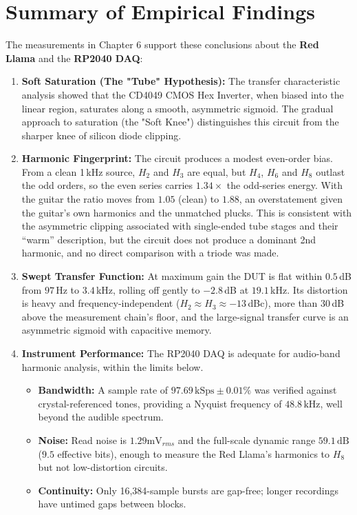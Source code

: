 \documentclass[11pt, a4paper]{report}
\begin{document}
\section{Summary of Empirical Findings}
The measurements in Chapter 6 support these conclusions about the \textbf{Red Llama} and the \textbf{RP2040 DAQ}:

\begin{enumerate}
  \item \textbf{Soft Saturation (The "Tube" Hypothesis):}
    The transfer characteristic analysis showed that the CD4049 CMOS Hex Inverter, when biased into the linear region, saturates along a smooth, asymmetric sigmoid.\cite{ti_cd4049ub_datasheet} The gradual approach to saturation (the "Soft Knee") distinguishes this circuit from the sharper knee of silicon diode clipping.

  \item \textbf{Harmonic Fingerprint:}
    The circuit produces a modest even-order bias. From a clean 1\,kHz source, $H_2$ and $H_3$ are equal, but $H_4$, $H_6$ and $H_8$ outlast the odd orders, so the even series carries $1.34\times$ the odd-series energy. With the guitar the ratio moves from $1.05$ (clean) to $1.88$, an overstatement given the guitar's own harmonics and the unmatched plucks. This is consistent with the asymmetric clipping associated with single-ended tube stages and their ``warm'' description,\cite{sonarworks_distortion_even_odd} but the circuit does not produce a dominant 2nd harmonic, and no direct comparison with a triode was made.

  \item \textbf{Swept Transfer Function:}
    At maximum gain the DUT is flat within $0.5$\,dB from $97$\,Hz to $3.4$\,kHz, rolling off gently to $-2.8$\,dB at $19.1$\,kHz. Its distortion is heavy and frequency-independent ($H_2 \approx H_3 \approx -13$\,dBc), more than $30$\,dB above the measurement chain's floor, and the large-signal transfer curve is an asymmetric sigmoid with capacitive memory.

  \item \textbf{Instrument Performance:}
    The RP2040 DAQ is adequate for audio-band harmonic analysis, within the limits below.
    \begin{itemize}
      \item \textbf{Bandwidth:} A sample rate of $97.69\,\text{kSps} \pm 0.01\%$ was verified against crystal-referenced tones, providing a Nyquist frequency of $48.8\,\text{kHz}$, well beyond the audible spectrum.\cite{nyquist_shannon_sampling}
      \item \textbf{Noise:} Read noise is $1.29\text{mV}_{rms}$ and the full-scale dynamic range $59.1\,\text{dB}$ ($9.5$ effective bits), enough to measure the Red Llama's harmonics to $H_8$ but not low-distortion circuits.
      \item \textbf{Continuity:} Only 16,384-sample bursts are gap-free; longer recordings have untimed gaps between blocks.
    \end{itemize}
\end{enumerate}
\end{document}
